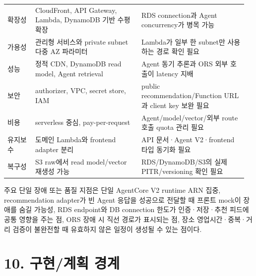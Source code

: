 \documentclass[12pt,a4paper]{article}
\newcommand{\DocNeedspace}[1]{\par\ifdim\dimexpr\pagegoal-\pagetotal\relax<#1\newpage\fi}
\renewcommand{\arraystretch}{1.35}
\newcommand{\TocNoChildTight}{\vspace{-0.28em}}
\begin{document}
\DocNeedspace{20\baselineskip}
\begin{small}
\setlength{\tabcolsep}{3pt}
\setlength{\extrarowheight}{1pt}
\renewcommand{\arraystretch}{1.46}
\begin{longtable}{@{}>{\RaggedRight\arraybackslash}m{0.115\linewidth}>{\RaggedRight\arraybackslash}m{0.423\linewidth}>{\RaggedRight\arraybackslash}m{0.423\linewidth}@{}}
\toprule
\multicolumn{1}{>{\centering\arraybackslash}m{0.115\linewidth}}{\textbf{특성}} & \multicolumn{1}{>{\centering\arraybackslash}m{0.423\linewidth}}{\textbf{현재 구조}} & \multicolumn{1}{>{\centering\arraybackslash}m{0.423\linewidth}}{\textbf{주요 고려사항}} \\
\midrule
\endhead
확장성 & CloudFront, API Gateway, Lambda, DynamoDB 기반 수평 확장 & RDS connection과 Agent concurrency가 병목 가능 \\
가용성 & 관리형 서비스와 private subnet 다중 AZ 파라미터 & Lambda가 일부 한 subnet만 사용하는 경로 확인 필요 \\
성능 & 정적 CDN, DynamoDB read model, Agent retrieval & Agent 동기 추론과 ORS 외부 호출이 latency 지배 \\
보안 & authorizer, VPC, secret store, IAM & public recommendation/Function URL과 client key 보완 필요 \\
비용 & serverless 중심, pay-per-request & Agent/model/vector/외부 route 호출 quota 관리 필요 \\
유지보수 & 도메인 Lambda와 frontend adapter \mbox{분리} & API 문서·Agent V2·frontend 타입 \mbox{동기화} 필요 \\
복구성 & S3 raw에서 read model/vector 재생성 가능 & RDS/DynamoDB/S3의 실제 PITR/versioning 확인 필요 \\
\bottomrule
\end{longtable}
\end{small}


\DocNeedspace{3\baselineskip}
주요 단일 장애 또는 품질 지점은 단일 AgentCore V2 runtime ARN 집중, recommendation adapter가 빈 Agent 응답을 성공으로 전달할 때 프론트 mock이 장애를 숨길 가능성, RDS endpoint와 DB connection 한도가 인증·저장·추천 피드에 공통 영향을 주는 점, ORS 장애 시 직선 경로가 표시되는 점, 장소 영업시간·중복·거리 검증이 불완전할 때 유효하지 않은 일정이 생성될 수 있는 점이다.


\newpage

\DocNeedspace{10\baselineskip}
\section*{10. 구현/계획 경계}
\addtocontents{toc}{\protect\TocNoChildTight}
\end{document}
